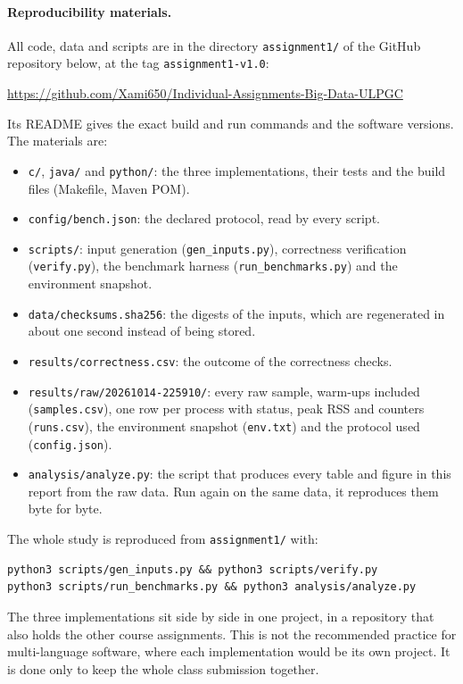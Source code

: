 \documentclass[11pt,a4paper]{article}
\newcommand{\repourl}{\url{https://github.com/Xami650/Individual-Assignments-Big-Data-ULPGC}}
\newcommand{\session}{\texttt{20261014-225910}}
\begin{document}
\paragraph{Reproducibility materials.} All code, data and scripts are in the
directory \texttt{assignment1/} of the GitHub repository below, at the tag
\texttt{assignment1-v1.0}:
\begin{center}\repourl\end{center}
Its README
gives the exact build and run commands and the software versions. The materials
are:
\begin{itemize}
  \item \texttt{c/}, \texttt{java/} and \texttt{python/}: the three
  implementations, their tests and the build files (Makefile, Maven POM).
  \item \texttt{config/bench.json}: the declared protocol, read by every script.
  \item \texttt{scripts/}: input generation (\texttt{gen\_inputs.py}),
  correctness verification (\texttt{verify.py}), the benchmark harness
  (\texttt{run\_benchmarks.py}) and the environment snapshot.
  \item \texttt{data/checksums.sha256}: the digests of the inputs, which are
  regenerated in about one second instead of being stored.
  \item \texttt{results/correctness.csv}: the outcome of the correctness checks.
  \item \texttt{results/raw/\session/}: every raw sample, warm-ups included
  (\texttt{samples.csv}), one row per process with status, peak RSS and counters
  (\texttt{runs.csv}), the environment snapshot (\texttt{env.txt}) and the
  protocol used (\texttt{config.json}).
  \item \texttt{analysis/analyze.py}: the script that produces every table and
  figure in this report from the raw data. Run again on the same data, it
  reproduces them byte for byte.
\end{itemize}

The whole study is reproduced from \texttt{assignment1/} with:
\begin{lstlisting}
python3 scripts/gen_inputs.py && python3 scripts/verify.py
python3 scripts/run_benchmarks.py && python3 analysis/analyze.py
\end{lstlisting}
The three implementations sit side by side in one project, in a repository that
also holds the other course assignments. This is not the recommended practice
for multi-language software, where each implementation would be its own
project. It is done only to keep the whole class submission together.
\end{document}
